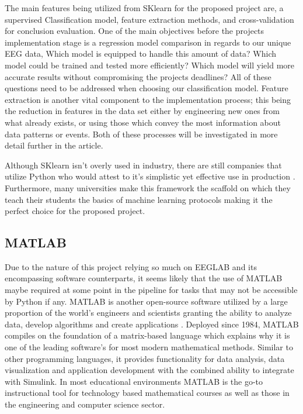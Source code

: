 \documentclass[12pt]{article}
\begin{document}
The main features being utilized from SKlearn for the proposed project are, a supervised Classification model, feature extraction methods, and cross-validation for conclusion evaluation. One of the main objectives before the projects implementation stage is a regression model comparison in regards to our unique EEG data, Which model is equipped to handle this amount of data? Which model could be trained and tested more efficiently? Which model will yield more accurate results without compromising the projects deadlines? All of these questions need to be addressed when choosing our classification model. Feature extraction is another vital component to the implementation process; this being the reduction in features in the data set either by engineering new ones from what already exists, or using those which convey the most information about data patterns or events. Both of these processes will be investigated in more detail further in the article.

Although SKlearn isn't overly used in industry, there are still companies that utilize Python who would attest to it's simplistic yet effective use in production \cite{cournapeau}. Furthermore, many universities make this framework the scaffold on which they teach their students the basics of machine learning protocols making it the perfect choice for the proposed project.

\subsection{MATLAB}
Due to the nature of this project relying so much on EEGLAB and its encompassing software counterparts, it seems likely that the use of MATLAB maybe required at some point in the pipeline for tasks that may not be accessible by Python if any. MATLAB is another open-source software utilized by a large proportion of the world's engineers and scientists granting the ability to analyze data, develop algorithms and create applications \cite{MATLAB:2010}. Deployed since 1984, MATLAB compiles on the foundation of a matrix-based language which explains why it is one of the leading software's for most modern mathematical methods. Similar to other programming languages, it provides functionality for data analysis, data visualization and application development with the combined ability to integrate with Simulink. In most educational environments MATLAB is the go-to instructional tool for technology based mathematical courses as well as those in the engineering and computer science sector.
\end{document}
